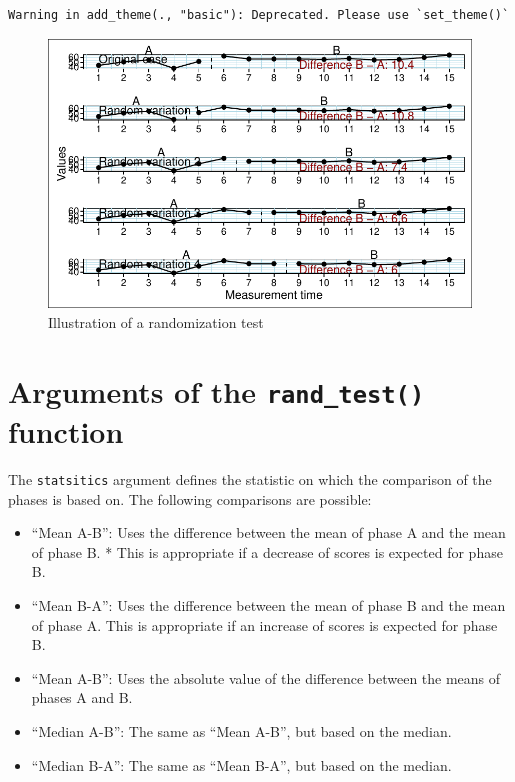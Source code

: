 \documentclass[
  letterpaper,
  DIV=11,
  numbers=noendperiod]{scrreprt}
\providecommand{\tightlist}{%
  \setlength{\itemsep}{0pt}\setlength{\parskip}{0pt}}\usepackage{longtable,booktabs,array}
\begin{document}
\begin{verbatim}
Warning in add_theme(., "basic"): Deprecated. Please use `set_theme()`
\end{verbatim}

\begin{figure}

{\centering \includegraphics{./ch_randomization_test_files/figure-pdf/fig-ex-rand-test-1.pdf}

}

\caption{\label{fig-ex-rand-test}Illustration of a randomization test}

\end{figure}

\hypertarget{arguments-of-the-rand_test-function}{%
\section{\texorpdfstring{Arguments of the \texttt{rand\_test()}
function}{Arguments of the rand\_test() function}}\label{arguments-of-the-rand_test-function}}

The \texttt{statsitics} argument defines the statistic on which the
comparison of the phases is based on. The following comparisons are
possible:

\begin{itemize}
\tightlist
\item
  ``Mean A-B'': Uses the difference between the mean of phase A and the
  mean of phase B. * This is appropriate if a decrease of scores is
  expected for phase B.
\item
  ``Mean B-A'': Uses the difference between the mean of phase B and the
  mean of phase A. This is appropriate if an increase of scores is
  expected for phase B.
\item
  ``Mean \textbar A-B\textbar{}'': Uses the absolute value of the
  difference between the means of phases A and B.
\item
  ``Median A-B'': The same as ``Mean A-B'', but based on the median.
\item
  ``Median B-A'': The same as ``Mean B-A'', but based on the median.
\end{itemize}
\end{document}
